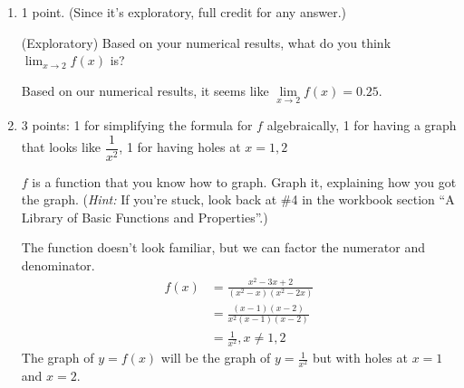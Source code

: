 \documentclass{article}
\begin{document}
\begin{enumerate}
\begin{enumerate}
    \pspace{0.25in}

  \item \label{limit-intro-numerical-guess}

    \begin{grading}
      1 point. (Since it's exploratory, full credit for any answer.) 
    \end{grading}

    \begin{problem}[\vfill\newpage]
      (Exploratory) Based on your numerical results, what do you think $\displaystyle \lim_{x \to 2} f(x)$ is? 
    \end{problem}

    \begin{solution}
      Based on our numerical results, it seems like $\lim\limits_{x \to 2} f(x) = 0.25$. 
    \end{solution}

  \item

    \begin{grading}
      3 points: 1 for simplifying the formula for $f$ algebraically, 1 for having a graph that looks like $\dfrac{1}{x^2}$, 1 for having holes at $x = 1, 2$
    \end{grading}

    \begin{problem}[\vfill]
      $f$ is a function that you know how to graph. Graph it, explaining how you got the graph. (\emph{Hint:} If you're stuck, look back at {{\#4}} in {the workbook section ``A Library of Basic Functions and Properties''}.) 
    \end{problem}

    \begin{solution}
      The function doesn't look familiar, but we can factor the numerator and denominator.
      \begin{align*}
        f(x) &= \frac{x^2 - 3x + 2}{(x^2-x)(x^2-2x)} \\
        &= \frac{(x-1)(x-2)}{x^2(x-1)(x-2)} \\
        &= \frac{1}{x^2}, x \neq 1, 2
      \end{align*}
      The graph of $y=f(x)$ will be the graph of $y=\frac{1}{x^2}$ but with holes at $x=1$ and $x=2$.

    \end{solution}


\end{enumerate}
\end{enumerate}
\end{document}
